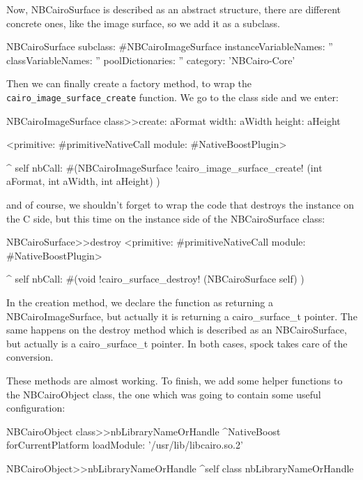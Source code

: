 \documentclass[a4paper,10pt,twoside]{book}
\begin{document}
Now, NBCairoSurface is described as an abstract structure, 
there are different concrete ones, like the image surface,
so we add it as a subclass.


\begin{classdef}{}
NBCairoSurface subclass: #NBCairoImageSurface
	instanceVariableNames: ''
	classVariableNames: ''
	poolDictionaries: ''
	category: 'NBCairo-Core'
\end{classdef}

Then we can finally create a factory method, to wrap the \verb|cairo_image_surface_create| function. We go to the class side and
we enter:

\begin{code}{}
NBCairoImageSurface class>>create: aFormat width: aWidth height: aHeight

	<primitive: #primitiveNativeCall module: #NativeBoostPlugin>
	
	^ self nbCall: #(NBCairoImageSurface !cairo\_image\_surface\_create! (int aFormat,
                                                         int aWidth,
                                                         int aHeight) )
\end{code}

and of course, we shouldn't forget to wrap the code that destroys the instance on the C side, but this time on the instance side of the NBCairoSurface class:

\begin{code}{}
NBCairoSurface>>destroy
	<primitive: #primitiveNativeCall module: #NativeBoostPlugin>
	
	^ self nbCall: #(void !cairo\_surface\_destroy! (NBCairoSurface self) )

\end{code}

In the creation method, we declare the function as returning a
NBCairoImageSurface, but actually it is returning a cairo\_surface\_t
pointer. The same happens on the destroy method which is described
as an NBCairoSurface, but actually is a cairo\_surface\_t pointer.
In both cases, spock takes care of the conversion.




These methods are almost working. To finish, we add some helper
functions to the NBCairoObject class, the one which was going
to contain some useful configuration:

\begin{code}{}
NBCairoObject class>>nbLibraryNameOrHandle
	^NativeBoost forCurrentPlatform loadModule: '/usr/lib/libcairo.so.2'

NBCairoObject>>nbLibraryNameOrHandle
	^self class nbLibraryNameOrHandle

\end{code}
\end{document}
